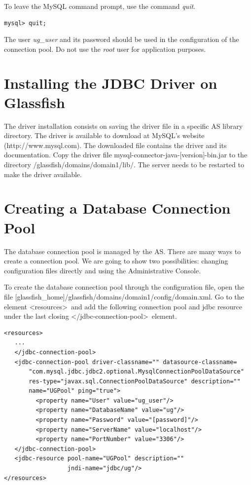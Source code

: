 \documentclass[envcountsame,envcountchap]{svmono}
\begin{document}
To leave the MySQL command prompt, use the command \textit{quit}.

\begin{verbatim}
mysql> quit;
\end{verbatim}

The user \textit{ug\_user} and its password should be used in the configuration of the connection pool. Do not use the \textit{root} user for application purposes.

\section{Installing the JDBC Driver on Glassfish}

The driver installation consists on saving the driver file in a specific AS library directory. The driver is available to download at MySQL's website (http://www.mysql.com). The downloaded file contains the driver and its documentation. Copy  the driver file mysql-connector-java-[version]-bin.jar to the directory /glassfish/domains/domain1/lib/. The server needs to be restarted to make the driver available.

\section{Creating a Database Connection Pool}
\label{sec:creating-database-connection-pool}

The database connection pool is managed by the AS. There are many ways to create a connection pool. We are going to show two possibilities: changing configuration files directly and using the Administrative Console.

To create the database connection pool through the configuration file, open the file [glassfish\_home]/glassfish/domains/domain1/config/domain.xml. Go to the element \textless resources\textgreater \ and add the following connection pool and jdbc resource under the last closing \textless /jdbc-connection-pool\textgreater \ element.

\begin{verbatim}
<resources>
   ...
   </jdbc-connection-pool>
   <jdbc-connection-pool driver-classname="" datasource-classname=
       "com.mysql.jdbc.jdbc2.optional.MysqlConnectionPoolDataSource"
       res-type="javax.sql.ConnectionPoolDataSource" description="" 
       name="UGPool" ping="true">
         <property name="User" value="ug_user"/>
         <property name="DatabaseName" value="ug"/>
         <property name="Password" value="[password]"/>
         <property name="ServerName" value="localhost"/>
         <property name="PortNumber" value="3306"/>
   </jdbc-connection-pool>
   <jdbc-resource pool-name="UGPool" description="" 
                  jndi-name="jdbc/ug"/>
</resources>
\end{verbatim}
\end{document}
